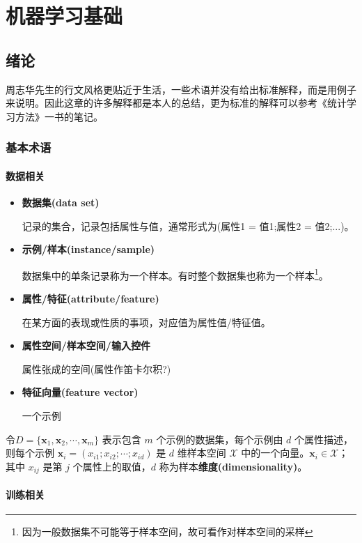 \chapter{机器学习基础}

\section{绪论}

周志华先生的行文风格更贴近于生活，一些术语并没有给出标准解释，而是用例子来说明。因此这章的许多解释都是本人的总结，更为标准的解释可以参考《统计学习方法》一书的笔记。

\subsection{基本术语}

\subsubsection{数据相关}

\begin{itemize}
    \item \textbf{数据集(data set)}
    
    记录的集合，记录包括属性与值，通常形式为(属性1 = 值1;属性2 = 值2;...)。
    \item \textbf{示例/样本(instance/sample)}
    
    数据集中的单条记录称为一个样本。有时整个数据集也称为一个样本\footnote{因为一般数据集不可能等于样本空间，故可看作对样本空间的采样}。
    \item \textbf{属性/特征(attribute/feature)}
    
    在某方面的表现或性质的事项，对应值为属性值/特征值。
    \item \textbf{属性空间/样本空间/输入控件}
    
    属性张成的空间(属性作笛卡尔积?)
    \item \textbf{特征向量(feature vector)}
    
    一个示例
\end{itemize}

令$D = \{\bm{x}_1,\bm{x}_2,\cdots,\bm{x}_m\}$ 表示包含 $m$ 个示例的数据集，每个示例由 $d$ 个属性描述，则每个示例 $\bm{x}_i = (x_{i1};x_{i2};\cdots;x_{id})$ 是 $d$ 维样本空间 $\mathcal{X}$ 中的一个向量。$\bm{x}_i \in \mathcal{X}$；其中 $x_{ij}$ 是第 $j$ 个属性上的取值，$d$ 称为样本\textbf{维度(dimensionality)}。

\subsubsection{训练相关}


